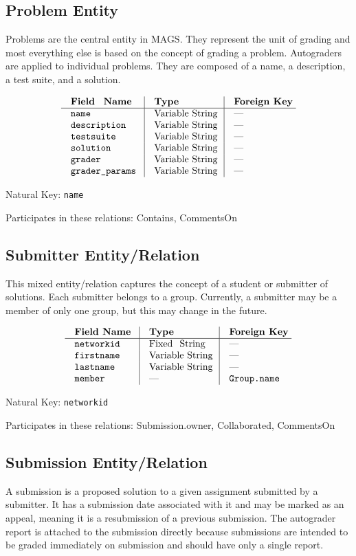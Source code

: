 \subsection{Problem Entity}
Problems are the central entity in MAGS. 
They represent the unit of grading and most everything else is based on 
the concept of grading a problem.
Autograders are applied to individual problems. 
They are composed of a name, a description, a test suite, and a solution.

$$\vbox{
  \offinterlineskip
  \halign{
    \strut \quad {\tt #}  & \vrule\quad #  & \vrule\quad # \cr
    {\bf Field Name}  & {\bf Type}  & {\bf Foreign Key}\cr
    \noalign{\hrule}    
    name  & Variable String  & --- \cr
    description  & Variable String  & --- \cr
    testsuite  & Variable String  & --- \cr
    solution  & Variable String & --- \cr
    grader & Variable String & --- \cr
    grader\_params & Variable String & --- \cr
  }
}$$

{\noindent
Natural Key: {\tt name}\par\noindent
Participates in these relations: Contains, CommentsOn\par}

\subsection{Submitter Entity/Relation}
This mixed entity/relation captures the concept
of a student or submitter of solutions.
Each submitter belongs to a group.
Currently, a submitter may be a member of only one group,
but this may change in the future.

$$\vbox{
  \offinterlineskip
  \halign{
    \strut \quad {\tt #}  & \vrule\quad #  & \vrule\quad # \cr
    {\bf Field Name}  & {\bf Type}  & {\bf Foreign Key}\cr
    \noalign{\hrule}    
    networkid  & Fixed String  & --- \cr
    firstname  & Variable String  & --- \cr
    lastname  & Variable String  & --- \cr
    member  & ---  & {\tt Group.name} \cr
  }
}$$

{\noindent
Natural Key: {\tt networkid}\par\noindent
Participates in these relations: Submission.owner, Collaborated, CommentsOn \par}

\subsection{Submission Entity/Relation}
A submission is a proposed solution to a given assignment
submitted by a submitter. It has a submission date associated with 
it and may be marked as an appeal, meaning it is a resubmission
of a previous submission.
The autograder report is attached to the submission directly 
because submissions are intended to be graded immediately on submission
and should have only a single report.


